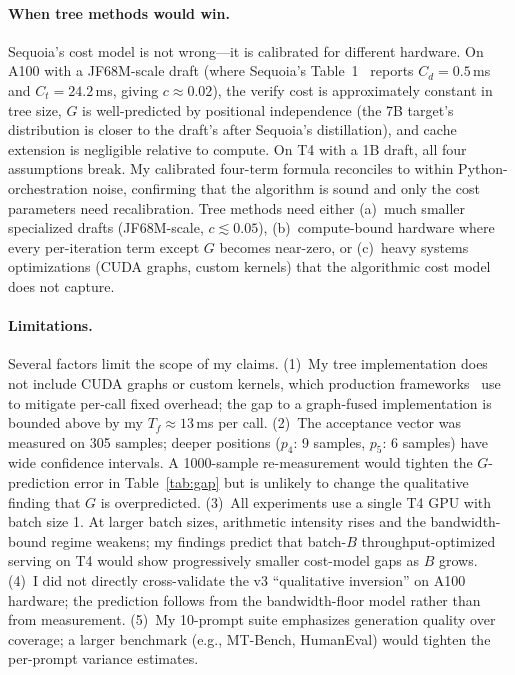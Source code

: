 \documentclass[letterpaper,twocolumn,10pt]{article}
\begin{document}
\paragraph{When tree methods would win.}
Sequoia's cost model is not wrong---it is calibrated for different hardware.
On A100 with a JF68M-scale draft (where Sequoia's Table~1~\cite{chen2024sequoia} reports $C_d = 0.5$\,ms and $C_t = 24.2$\,ms, giving $c \approx 0.02$), the verify cost is approximately constant in tree size, $G$ is well-predicted by positional independence (the 7B target's distribution is closer to the draft's after Sequoia's distillation), and cache extension is negligible relative to compute.
On T4 with a 1B draft, all four assumptions break.
My calibrated four-term formula reconciles to within Python-orchestration noise, confirming that the algorithm is sound and only the cost parameters need recalibration.
Tree methods need either (a)~much smaller specialized drafts (JF68M-scale, $c \lesssim 0.05$), (b)~compute-bound hardware where every per-iteration term except $G$ becomes near-zero, or (c)~heavy systems optimizations (CUDA graphs, custom kernels) that the algorithmic cost model does not capture.

\paragraph{Limitations.}
Several factors limit the scope of my claims.
(1)~My tree implementation does not include CUDA graphs or custom kernels, which production frameworks~\cite{vllm_docs,trtllm_docs} use to mitigate per-call fixed overhead; the gap to a graph-fused implementation is bounded above by my $T_f \approx 13$\,ms per call.
(2)~The acceptance vector was measured on 305 samples; deeper positions ($p_4$: 9 samples, $p_5$: 6 samples) have wide confidence intervals.
A 1000-sample re-measurement would tighten the $G$-prediction error in Table~\ref{tab:gap} but is unlikely to change the qualitative finding that $G$ is overpredicted.
(3)~All experiments use a single T4 GPU with batch size 1.
At larger batch sizes, arithmetic intensity rises and the bandwidth-bound regime weakens; my findings predict that batch-$B$ throughput-optimized serving on T4 would show progressively smaller cost-model gaps as $B$ grows.
(4)~I did not directly cross-validate the v3 ``qualitative inversion'' on A100 hardware; the prediction follows from the bandwidth-floor model rather than from measurement.
(5)~My 10-prompt suite emphasizes generation quality over coverage; a larger benchmark (e.g., MT-Bench, HumanEval) would tighten the per-prompt variance estimates.
\end{document}

